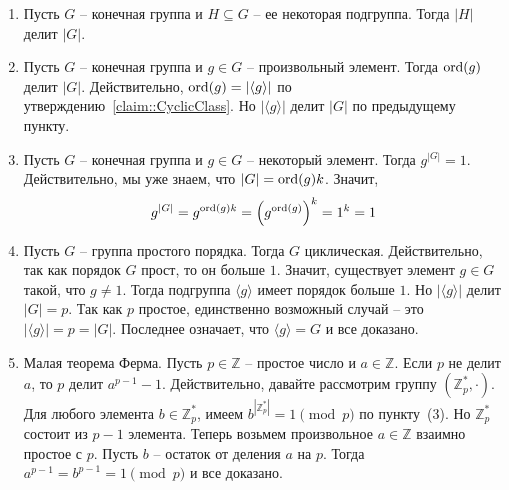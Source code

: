 \begin{enumerate}
\item Пусть $G$ -- конечная группа и $H\subseteq G$ -- ее некоторая подгруппа.
Тогда $|H|$ делит $|G|$.

\item Пусть $G$ -- конечная группа и $g\in G$ -- произвольный элемент.
Тогда $\operatorname{ord}(g)$ делит $|G|$.
Действительно, $\operatorname{ord}(g) = |\langle g \rangle|$ по утверждению~\ref{claim::CyclicClass}.
Но $|\langle g\rangle|$ делит $|G|$ по предыдущему пункту.

\item Пусть $G$ -- конечная группа и $g\in G$ -- некоторый элемент.
Тогда $g^{|G|} = 1$.
Действительно, мы уже знаем, что $|G| = \operatorname{ord}(g) k$.
Значит, 
\[
g^{|G|} = g^{\operatorname{ord}(g)k} = \left(g^{\operatorname{ord}(g)}\right)^{k} = 1^k = 1
\]

\item Пусть $G$ -- группа простого порядка.
Тогда $G$ циклическая.
Действительно, так как порядок $G$ прост, то он больше $1$.
Значит, существует элемент $g\in G$ такой, что $g\neq 1$.
Тогда подгруппа $\langle g\rangle$ имеет порядок больше $1$.
Но $|\langle g \rangle|$ делит $|G| = p$.
Так как $p$ простое, единственно возможный случай -- это $|\langle g \rangle| = p = |G|$.
Последнее означает, что $\langle g \rangle = G$ и все доказано.

\item Малая теорема Ферма.
Пусть $p\in \mathbb Z$ -- простое число и $a\in \mathbb Z$.
Если $p$ не делит $a$,  то $p$ делит $a^{p-1}-1$.
Действительно, давайте рассмотрим группу $(\mathbb Z_p^*, \cdot)$.
Для любого элемента $b\in \mathbb Z_p^*$, имеем $b^{|\mathbb Z_p^*|} = 1 \pmod p$ по пункту~(3).
Но $\mathbb Z_p^*$ состоит из $p-1$ элемента.
Теперь возьмем произвольное $a\in \mathbb Z$ взаимно простое с $p$.
Пусть $b$ -- остаток от деления $a$ на $p$.
Тогда $a^{p-1} = b^{p-1} = 1\pmod p$ и все доказано.
\end{enumerate}
